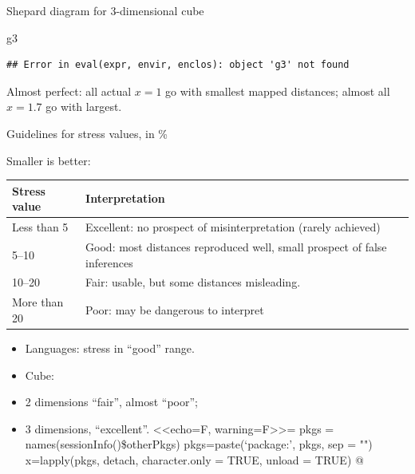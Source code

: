 \documentclass[ignorenonframetext,]{beamer}
\newenvironment{Shaded}{\begin{snugshade}}{\end{snugshade}}
\newcommand{\NormalTok}[1]{#1}
\begin{document}
\begin{frame}[fragile]{Shepard diagram for 3-dimensional cube}
\protect\hypertarget{shepard-diagram-for-3-dimensional-cube}{}

\begin{Shaded}
\begin{Highlighting}[]
\NormalTok{g3}
\end{Highlighting}
\end{Shaded}

\begin{verbatim}
## Error in eval(expr, envir, enclos): object 'g3' not found
\end{verbatim}

Almost perfect: all actual \(x=1\) go with smallest mapped distances;
almost all \(x=1.7\) go with largest.

\end{frame}

\begin{frame}{Guidelines for stress values, in \%}
\protect\hypertarget{guidelines-for-stress-values-in}{}

Smaller is better:

\begin{tabular}{lp{3in}}
Stress value & Interpretation \\
\hline
Less than 5 & Excellent: no prospect of misinterpretation (rarely achieved)\\
5--10 & Good: most distances reproduced well, small prospect of false inferences\\
10--20 & Fair: usable, but some distances misleading.\\
More than 20 & Poor: may be dangerous to interpret\\
\hline
\end{tabular}

\begin{itemize}
\item
  Languages: stress in ``good'' range.
\item
  Cube:
\item
  2 dimensions ``fair'', almost ``poor'';
\item
  3 dimensions, ``excellent''. \textless{}\textless{}echo=F,
  warning=F\textgreater{}\textgreater{}= pkgs =
  names(sessionInfo()\$otherPkgs) pkgs=paste(`package:', pkgs, sep = "")
  x=lapply(pkgs, detach, character.only = TRUE, unload = TRUE) @
\end{itemize}

\end{frame}
\end{document}
